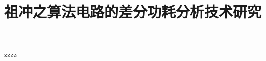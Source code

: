 \documentclass{beamer}
\title{祖冲之算法电路的差分功耗分析技术研究}
\begin{document}
\frame{\titlepage}

\begin{frame}

zzzz

\end{frame}
\end{document}
